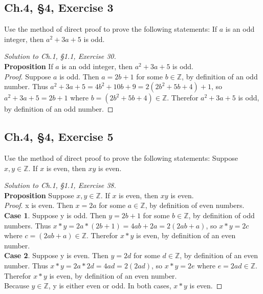 \documentclass[12pt]{amsart}
\numberwithin{equation}{section}
\theoremstyle{definition}
\theoremstyle{remark}
\begin{document}


\subsection*{Ch.4, \S 4,  Exercise 3}  Use the method of direct proof to prove the following statements: If $ a $ is an odd integer, then $ a^2 + 3a + 5 $ is odd.

\begin{proof}[Solution to Ch.1, \S 1.1,  Exercise 30] \ \\
\textbf{Proposition} If $ a $ is an odd integer, then $ a^2 + 3a + 5 $ is odd. \ \\
\textit{Proof}. Suppose $ a $ is odd. Then $ a = 2b + 1 $ for some $ b \in \mathbb{Z} $, by definition of an odd number. Thus $ a^2 + 3a + 5 = 4b^2 + 10b + 9 = 2(2b^2 + 5b + 4) + 1 $, so $ a^2 + 3a + 5 = 2b + 1 $ where $ b = (2b^2 + 5b + 4) \in \mathbb{Z} $. Therefor $ a^2 + 3a + 5 $ is odd, by definition of an odd number.
\end{proof}





\subsection*{Ch.4, \S 4,  Exercise 5}  Use the method of direct proof to prove the following statements: Suppose $ x,y \in \mathbb{Z} $. If $ x $ is even, then $ xy $ is even.


\begin{proof}[Solution to Ch.1, \S 1.1,  Exercise 38]\ \\
\textbf{Proposition} Suppose $ x,y \in \mathbb{Z} $. If $ x $ is even, then $ xy $ is even.\ \\
\textit{Proof}. x is even. Then $ x = 2a $ for some $ a \in \mathbb{Z} $, by definition of even numbers.\\
\textbf{Case 1}. Suppose y is odd. Then $ y = 2b + 1 $ for some $ b \in \mathbb{Z} $, by definition of odd numbers. Thus $ x*y = 2a * (2b + 1) = 4ab + 2a = 2(2ab + a) $, so $ x*y = 2c $ where $ c = (2ab + a) \in \mathbb{Z} $. Therefor $ x*y $ is even, by definition of an even number.\\
\textbf{Case 2}. Suppose y is even. Then $ y = 2d $ for some $ d \in \mathbb{Z} $, by definition of an even number. Thus $ x * y = 2a * 2d = 4ad = 2(2ad) $, so $ x * y = 2e $ where $ e = 2ad \in \mathbb{Z} $. Therefor $ x*y $ is even, by definition of an even number.\\
Because $ y \in \mathbb{Z} $, y is either even or odd. In both cases, $ x*y $ is even.

\end{proof}
\end{document}
